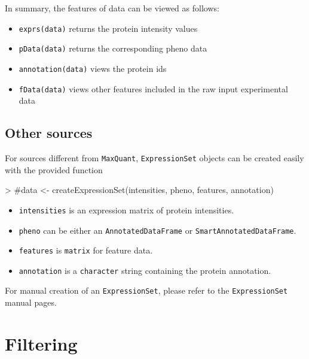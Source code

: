 \documentclass[a4paper,11pt]{article}
\newcommand{\Robject}[1]{{\texttt{#1}}}
\newcommand{\Rfunction}[1]{{\texttt{#1}}}
\begin{document}
In summary, the features of data can be viewed as follows:
\begin{itemize}
   \item \Rfunction{exprs(data)} returns the protein intensity values 
   \item \Rfunction{pData(data)} returns the corresponding pheno data
   \item \Rfunction{annotation(data)} views the protein ids
   \item \Rfunction{fData(data)} views other features included in the raw input experimental data 
\end{itemize}


\subsection{Other sources}

For sources different from \texttt{MaxQuant}, \Robject{ExpressionSet} objects can be created easily with the provided function

\begin{Schunk}
\begin{Sinput}
> #data <- createExpressionSet(intensities, pheno, features, annotation)
\end{Sinput}
\end{Schunk}

\begin{itemize}
   \item \Robject{intensities} is an expression matrix of protein intensities.
   \item \Robject{pheno} can be either an \Robject{AnnotatedDataFrame} or \Robject{SmartAnnotatedDataFrame}.      
   \item \Robject{features} is \Robject{matrix} for feature data.
   \item \Robject{annotation} is a \Robject{character} string containing the protein annotation.
\end{itemize}
For manual creation of an \Robject{ExpressionSet}, please refer to the \Robject{ExpressionSet} manual pages.


\section{Filtering}
\end{document}
